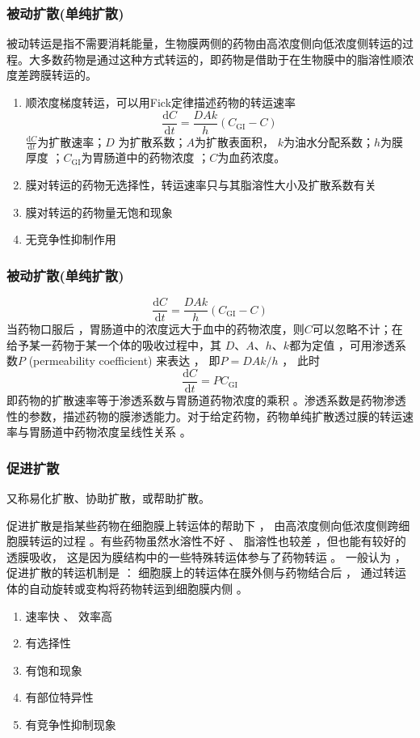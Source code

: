 \begin{frame}
    \frametitle{被动扩散(单纯扩散)}
    被动转运是指不需要消耗能量，生物膜两侧的药物由高浓度侧向低浓度侧转运的过程。大多数药物是通过这种方式转运的，即药物是借助于在生物膜中的脂溶性顺浓度差跨膜转运的。
    
        \begin{enumerate}
          \item 顺浓度梯度转运，可以用Fick定律描述药物的转运速率
          \[
            \frac{\mathrm{d}C}{\mathrm{d}t}=\frac{DAk}{h}(C_{\mathrm{GI}}-C)
          \]
          $\frac{\mathrm{d}C}{\mathrm{d}t}$为扩散速率；$D$ 为扩散系数；$A$为扩散表面积， $k$为油水分配系数；$h$为膜厚度 ；$C_{\mathrm{GI}}$为胃肠道中的药物浓度 ；$C$为血药浓度。
          \item 膜对转运的药物无选择性，转运速率只与其脂溶性大小及扩散系数有关
          \item 膜对转运的药物量无饱和现象
          \item 无竞争性抑制作用
        \end{enumerate}
\end{frame}


\begin{frame}
    \frametitle{被动扩散(单纯扩散)}
    \[
        \frac{\mathrm{d}C}{\mathrm{d}t}=\frac{DAk}{h}(C_{\mathrm{GI}}-C)
    \]
    当药物口服后 ，胃肠道中的浓度远大于血中的药物浓度，则$C$可以忽略不计；在给予某一药物于某一个体的吸收过程中，其 $D$、$A$、$h$、$k$都为定值 ，可用渗透系数$P$ (permeability coefficient) 来表达 ， 即$ P =DAk/h$ ， 此时
    \[
        \frac{\mathrm{d}C}{\mathrm{d}t}=PC_{\mathrm{GI}}
    \]
    即药物的扩散速率等于渗透系数与胃肠道药物浓度的乘积 。渗透系数是药物渗透性的参数，描述药物的膜渗透能力。对于给定药物，药物单纯扩散透过膜的转运速率与胃肠道中药物浓度呈线性关系 。
\end{frame}

\begin{frame}
  \frametitle{促进扩散}
  又称易化扩散、协助扩散，或帮助扩散。

  促进扩散是指某些药物在细胞膜上转运体的帮助下 ， 由高浓度侧向低浓度侧跨细胞膜转运的过程 。有些药物虽然水溶性不好 、 脂溶性也较差 ，但也能有较好的透膜吸收， 这是因为膜结构中的一些特殊转运体参与了药物转运 。 一般认为 ， 促进扩散的转运机制是 ： 细胞膜上的转运体在膜外侧与药物结合后 ， 通过转运体的自动旋转或变构将药物转运到细胞膜内侧 。

  \begin{enumerate}
    \item 速率快 、 效率高
    \item 有选择性
    \item 有饱和现象
    \item 有部位特异性
    \item 有竞争性抑制现象
  \end{enumerate}

\end{frame}


